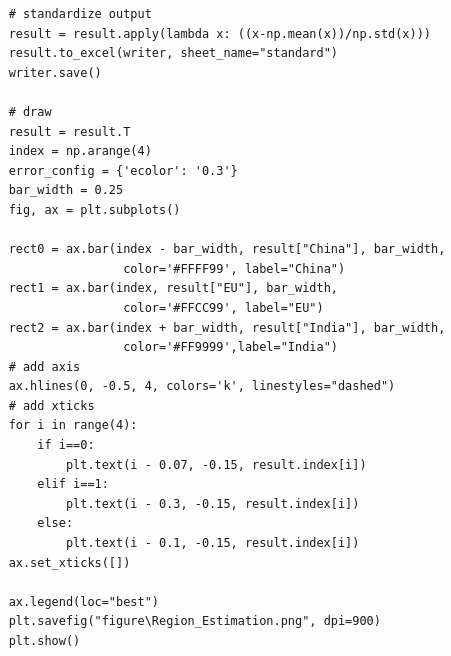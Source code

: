 \documentclass{mcmthesis}
\begin{document}
\begin{appendices}
\begin{lstlisting}
	# standardize output
	result = result.apply(lambda x: ((x-np.mean(x))/np.std(x))) 
	result.to_excel(writer, sheet_name="standard")
	writer.save()

	# draw
	result = result.T
	index = np.arange(4)
	error_config = {'ecolor': '0.3'}
	bar_width = 0.25
	fig, ax = plt.subplots()
	
	rect0 = ax.bar(index - bar_width, result["China"], bar_width, 
					color='#FFFF99', label="China")
	rect1 = ax.bar(index, result["EU"], bar_width,
					color='#FFCC99', label="EU")
	rect2 = ax.bar(index + bar_width, result["India"], bar_width,  
					color='#FF9999',label="India")
	# add axis
	ax.hlines(0, -0.5, 4, colors='k', linestyles="dashed")
	# add xticks
	for i in range(4):
		if i==0:
			plt.text(i - 0.07, -0.15, result.index[i])
		elif i==1:
			plt.text(i - 0.3, -0.15, result.index[i])
		else:
			plt.text(i - 0.1, -0.15, result.index[i])
	ax.set_xticks([])
	
	ax.legend(loc="best")
	plt.savefig("figure\Region_Estimation.png", dpi=900)
	plt.show()
	
\end{lstlisting}



\end{appendices}
\end{document}
